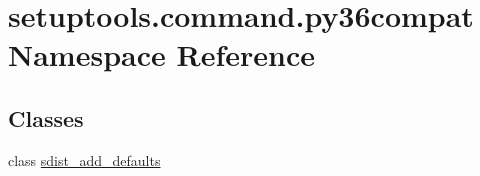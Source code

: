 \hypertarget{namespacesetuptools_1_1command_1_1py36compat}{}\section{setuptools.\+command.\+py36compat Namespace Reference}
\label{namespacesetuptools_1_1command_1_1py36compat}
\subsection*{Classes}
\begin{DoxyCompactItemize}
\item 
class \hyperlink{classsetuptools_1_1command_1_1py36compat_1_1sdist__add__defaults}{sdist\+\_\+add\+\_\+defaults}
\end{DoxyCompactItemize}
